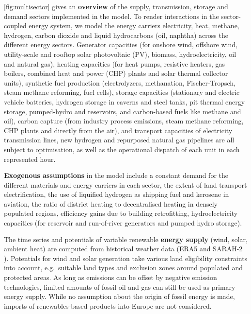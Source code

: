 \cref{fig:multisector} gives an \textbf{overview} of the supply, transmission,
storage and demand sectors implemented in the model. To render interactions in
the sector-coupled energy system, we model the energy carriers electricity,
heat, methane, hydrogen, carbon dioxide and liquid hydrocarbons (oil, naphtha)
across the different energy sectors. Generator capacities (for onshore wind,
offshore wind, utility-scale and rooftop solar photovoltaic (PV), biomass,
hydroelectricity, oil and natural gas), heating capacities (for heat pumps,
resistive heaters, gas boilers, combined heat and power (CHP) plants and solar
thermal collector units), synthetic fuel production (electrolyzers, methanation,
Fischer-Tropsch, steam methane reforming, fuel cells), storage capacities
(stationary and electric vehicle batteries, hydrogen storage in caverns and
steel tanks, pit thermal energy storage, pumped-hydro and reservoirs, and
carbon-based fuels like methane and oil), carbon capture (from industry process
emissions, steam methane reforming, CHP plants and directly from the air), and
transport capacities of electricity transmission lines, new hydrogen and
repurposed natural gas pipelines are all subject to optimisation, as well as the
operational dispatch of each unit in each represented hour.

\textbf{Exogenous assumptions} in the model include a constant demand for the
different materials and energy carriers in each sector, the extent of land
transport electrification, the use of liquified hydrogen as shipping fuel and
kerosene in aviation, the ratio of district heating to decentralised heating in
densely populated regions, efficiency gains due to building retrofitting,
hydroelectricity capacities (for reservoir and run-of-river generators and
pumped hydro storage).

The time series and potentials of variable renewable \textbf{energy supply}
(wind, solar, ambient heat) are computed from historical weather data (ERA5
\cite{ecmwf} and SARAH-2 \cite{SARAH}). Potentials for wind and solar generation
take various land eligibility constraints into account, e.g.~suitable land types
and exclusion zones around populated and protected areas. As long as emissions
can be offset by negative emission technologies, limited amounts of fossil oil
and gas can still be used as primary energy supply. While no assumption about
the origin of fossil energy is made, imports of renewables-based products into
Europe are not considered.

